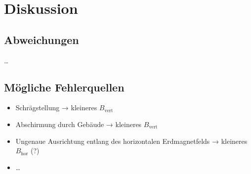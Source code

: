 \section{Diskussion}
\label{sec:diskussion}

\subsection{Abweichungen}

…


\subsection{Mögliche Fehlerquellen}

\begin{itemize}
    \item Schrägstellung → kleineres $B_\text{vert}$
    \item Abschirmung durch Gebäude → kleineres $B_\text{vert}$
    \item Ungenaue Ausrichtung entlang des horizontalen Erdmagnetfelds → kleineres $B_\text{hor}$ (?)
    \item …
\end{itemize}
